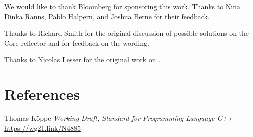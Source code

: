 \documentclass{wg21}
\begin{document}
We would like to thank Bloomberg for sponsoring this work.
Thanks to Nina Dinka Ranns, Pablo Halpern, and Joshua Berne for their feedback.

Thanks to Richard Smith for the original discussion of possible solutions on the Core reflector and for feedback on the wording.

Thanks to Nicolas Lesser for the original work on .

\section{References}

\renewcommand{\section}[2]{}%



\begin{thebibliography}{9}

Thomas Köppe
\emph{Working Draft, Standard for Programming Language C++}\newline
\url{https://wg21.link/N4885}


\end{thebibliography}
\end{document}
